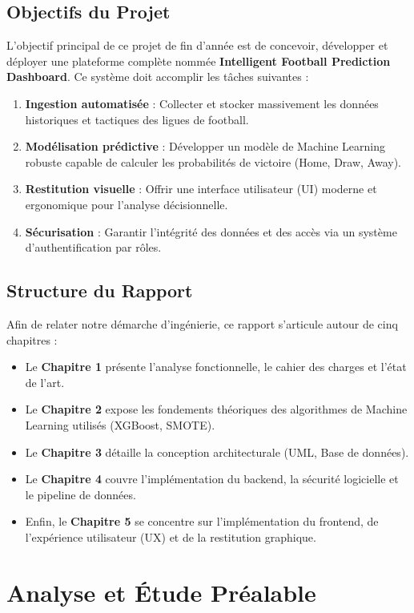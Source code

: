 \documentclass[12pt,a4paper,oneside]{book}
\begin{document}
\section*{Objectifs du Projet}
L'objectif principal de ce projet de fin d'année est de concevoir, développer et déployer une plateforme complète nommée \textbf{Intelligent Football Prediction Dashboard}. Ce système doit accomplir les tâches suivantes :
\begin{enumerate}
    \item \textbf{Ingestion automatisée} : Collecter et stocker massivement les données historiques et tactiques des ligues de football.
    \item \textbf{Modélisation prédictive} : Développer un modèle de Machine Learning robuste capable de calculer les probabilités de victoire (Home, Draw, Away).
    \item \textbf{Restitution visuelle} : Offrir une interface utilisateur (UI) moderne et ergonomique pour l'analyse décisionnelle.
    \item \textbf{Sécurisation} : Garantir l'intégrité des données et des accès via un système d'authentification par rôles.
\end{enumerate}

\section*{Structure du Rapport}
Afin de relater notre démarche d'ingénierie, ce rapport s'articule autour de cinq chapitres :
\begin{itemize}
    \item Le \textbf{Chapitre 1} présente l'analyse fonctionnelle, le cahier des charges et l'état de l'art.
    \item Le \textbf{Chapitre 2} expose les fondements théoriques des algorithmes de Machine Learning utilisés (XGBoost, SMOTE).
    \item Le \textbf{Chapitre 3} détaille la conception architecturale (UML, Base de données).
    \item Le \textbf{Chapitre 4} couvre l'implémentation du backend, la sécurité logicielle et le pipeline de données.
    \item Enfin, le \textbf{Chapitre 5} se concentre sur l'implémentation du frontend, de l'expérience utilisateur (UX) et de la restitution graphique.
\end{itemize}

\chapter{Analyse et Étude Préalable}
\end{document}
